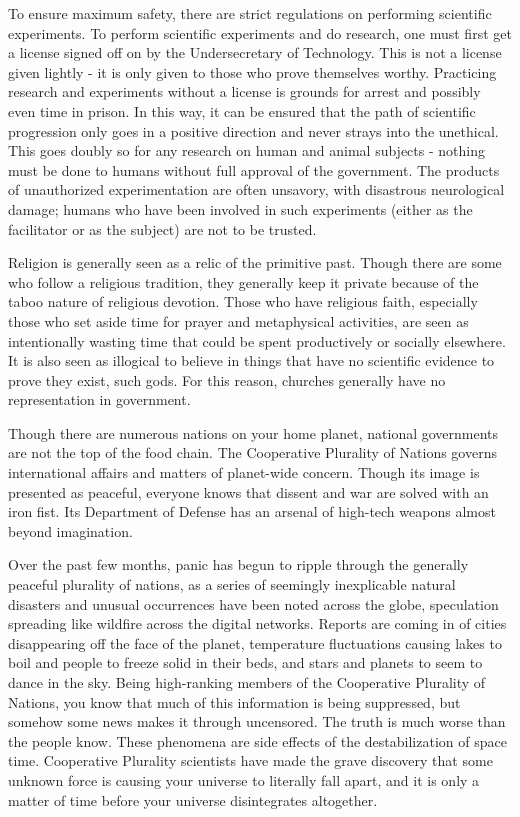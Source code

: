 \documentclass[blue]{guildcamp3}
\begin{document}
To ensure maximum safety, there are strict regulations on performing scientific experiments. To perform scientific experiments and do research, one must first get a license signed off on by the Undersecretary of Technology. This is not a license given lightly - it is only given to those who prove themselves worthy. Practicing research and experiments without a license is grounds for arrest and possibly even time in prison. In this way, it can be ensured that the path of scientific progression only goes in a positive direction and never strays into the unethical. This goes doubly so for any research on human and animal subjects - nothing must be done to humans without full approval of the government. The products of unauthorized experimentation are often unsavory, with disastrous neurological damage; humans who have been involved in such experiments (either as the facilitator or as the subject) are not to be trusted.

Religion is generally seen as a relic of the primitive past. Though there are some who follow a religious tradition, they generally keep it private because of the taboo nature of religious devotion. Those who have religious faith, especially those who set aside time for prayer and metaphysical activities, are seen as intentionally wasting time that could be spent productively or socially elsewhere. It is also seen as illogical to believe in things that have no scientific evidence to prove they exist, such gods. For this reason, churches generally have no representation in government.

Though there are numerous nations on your home planet, national governments are not the top of the food chain. The Cooperative Plurality of Nations governs international affairs and matters of planet-wide concern. Though its image is presented as peaceful, everyone knows that dissent and war are solved with an iron fist. Its Department of Defense has an arsenal of high-tech weapons almost beyond imagination.

Over the past few months, panic has begun to ripple through the generally peaceful plurality of nations, as a series of seemingly inexplicable natural disasters and unusual occurrences have been noted across the globe, speculation spreading like wildfire across the digital networks. Reports are coming in of cities disappearing off the face of the planet, temperature fluctuations causing lakes to boil and people to freeze solid in their beds, and stars and planets to seem to dance in the sky. Being high-ranking members of the Cooperative Plurality of Nations, you know that much of this information is being suppressed, but somehow some news makes it through uncensored. The truth is much worse than the people know. These phenomena are side effects of the destabilization of space time. Cooperative Plurality scientists have made the grave discovery that some unknown force is causing your universe to literally fall apart, and it is only a matter of time before your universe disintegrates altogether.
\end{document}

